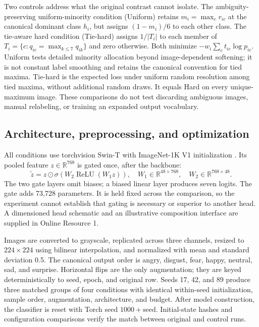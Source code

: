 \documentclass[pdflatex,sn-mathphys-num]{sn-jnl}
\begin{document}
Two controls address what the original contrast cannot isolate. The ambiguity-preserving uniform-minority condition (Uniform) retains $m_i=\max_c r_{ic}$ at the canonical dominant class $h_i$, but assigns $(1-m_i)/6$ to each other class. The tie-aware hard condition (Tie-hard) assigns $1/|T_i|$ to each member of $T_i=\{c:q_{ic}=\max_{k\leq7}q_{ik}\}$ and zero otherwise. Both minimize $-w_i\sum_c t_{ic}\log p_{ic}$. Uniform tests detailed minority allocation beyond image-dependent softening; it is not constant label smoothing and retains the canonical convention for tied maxima. Tie-hard is the expected loss under uniform random resolution among tied maxima, without additional random draws. It equals Hard on every unique-maximum image. These comparisons do not test discarding ambiguous images, manual relabeling, or training an expanded output vocabulary.

\subsection{Architecture, preprocessing, and optimization}
All conditions use torchvision Swin-T with ImageNet-1K V1 initialization \cite{liu2021swin,deng2009imagenet,paszke2019pytorch}. Its pooled feature $z\in\mathbb{R}^{768}$ is gated once, after the backbone:
\begin{equation}
\tilde z=z\odot\sigma\!\left(W_2\operatorname{ReLU}(W_1z)\right),
\quad W_1\in\mathbb{R}^{48\times768},\quad W_2\in\mathbb{R}^{768\times48}.
\end{equation}
The two gate layers omit biases; a biased linear layer produces seven logits. The gate adds 73,728 parameters. It is held fixed across the comparison, so the experiment cannot establish that gating is necessary or superior to another head.
A dimensioned head schematic and an illustrative composition interface are supplied in Online Resource 1.

Images are converted to grayscale, replicated across three channels, resized to $224\times224$ using bilinear interpolation, and normalized with mean and standard deviation 0.5. The canonical output order is angry, disgust, fear, happy, neutral, sad, and surprise. Horizontal flips are the only augmentation; they are keyed deterministically to seed, epoch, and original row. Seeds 17, 42, and 89 produce three matched groups of four conditions with identical within-seed initialization, sample order, augmentation, architecture, and budget. After model construction, the classifier is reset with Torch seed $1000+\mathrm{seed}$. Initial-state hashes and configuration comparisons verify the match between original and control runs.
\end{document}
